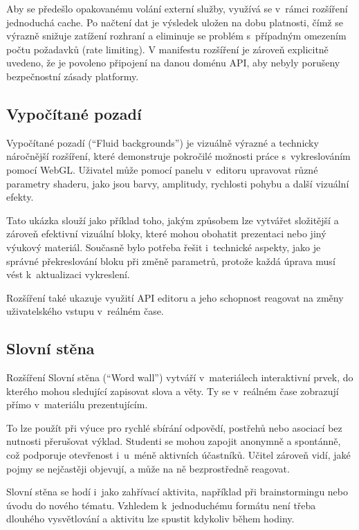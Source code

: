 Aby se předešlo opakovanému volání externí služby, využívá se v~rámci rozšíření jednoduchá cache. 
Po načtení dat je výsledek uložen na dobu platnosti, čímž se výrazně snižuje zatížení rozhraní a eliminuje se problém s~případným omezením počtu požadavků (rate limiting).
V manifestu rozšíření je zároveň explicitně uvedeno, že je povoleno připojení na danou doménu API, aby nebyly porušeny bezpečnostní zásady platformy.

\subsection{Vypočítané pozadí}

Vypočítané pozadí (\enquote{Fluid backgrounds}) je vizuálně výrazné a technicky náročnější rozšíření, které demonstruje pokročilé možnosti práce s~vykreslováním pomocí WebGL.
Uživatel může pomocí panelu v~editoru upravovat různé parametry shaderu, jako jsou barvy, amplitudy, rychlosti pohybu a další vizuální efekty.

Tato ukázka slouží jako příklad toho, jakým způsobem lze vytvářet složitější a zároveň efektivní vizuální bloky, které mohou obohatit prezentaci nebo jiný výukový materiál. 
Současně bylo potřeba řešit i~technické aspekty, jako je správné překreslování bloku při změně parametrů, protože každá úprava musí vést k~aktualizaci vykreslení.

Rozšíření také ukazuje využití API editoru a jeho schopnost reagovat na změny uživatelského vstupu v~reálném čase.

\subsection{Slovní stěna}


Rozšíření Slovní stěna (\enquote{Word wall}) vytváří v~materiálech interaktivní prvek, do kterého mohou sledující zapisovat slova a věty. 
Ty se v~reálném čase zobrazují přímo v~materiálu prezentujícím.

To lze použít při výuce pro rychlé sbírání odpovědí, postřehů nebo asociací bez nutnosti přerušovat výklad. 
Studenti se mohou zapojit anonymně a spontánně, což podporuje otevřenost i~u~méně aktivních účastníků. 
Učitel zároveň vidí, jaké pojmy se nejčastěji objevují, a může na ně bezprostředně reagovat.

Slovní stěna se hodí i~jako zahřívací aktivita, například při brainstormingu nebo úvodu do nového tématu. 
Vzhledem k~jednoduchému formátu není třeba dlouhého vysvětlování a aktivitu lze spustit kdykoliv během hodiny.

